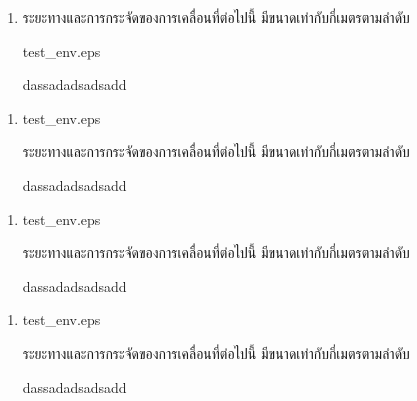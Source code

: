 \documentclass[a4paper,12pt]{book}
\begin{document}
\begin{enumerate}
\item 	\begin{ljrp} 
		 	ระยะทางและการกระจัดของการเคลื่อนที่ต่อไปนี้ มีขนาดเท่ากับกี่เมตรตามลําดับ
		\end{ljrp}
		\begin{rp}{test_env.eps}\end{rp}
		\begin{1c}
			{das}{sada}{dsad}{sadd}
		\end{1c}
\end{enumerate}
\begin{enumerate}
\item	\begin{lp}{test_env.eps}\end{lp}
		\begin{rjlp}
			ระยะทางและการกระจัดของการเคลื่อนที่ต่อไปนี้ มีขนาดเท่ากับกี่เมตรตามลําดับ
		\end{rjlp}
		\begin{4c}
			{das}{sada}{dsad}{sadd}
		\end{4c}
\end{enumerate}
\begin{enumerate}
\item	\begin{lp}{test_env.eps}\end{lp}
		\begin{rjlp}
			ระยะทางและการกระจัดของการเคลื่อนที่ต่อไปนี้ มีขนาดเท่ากับกี่เมตรตามลําดับ
		\end{rjlp}
		\begin{2c}
			{das}{sada}{dsad}{sadd}
		\end{2c}
\end{enumerate}
\begin{enumerate}
\item	\begin{lp}{test_env.eps}\end{lp}
		\begin{rjlp}
			ระยะทางและการกระจัดของการเคลื่อนที่ต่อไปนี้ มีขนาดเท่ากับกี่เมตรตามลําดับ
		\end{rjlp}
		\vspace{-25pt}
		\begin{1c}
			{das}{sada}{dsad}{sadd}
		\end{1c}
\end{enumerate}
\end{document}
